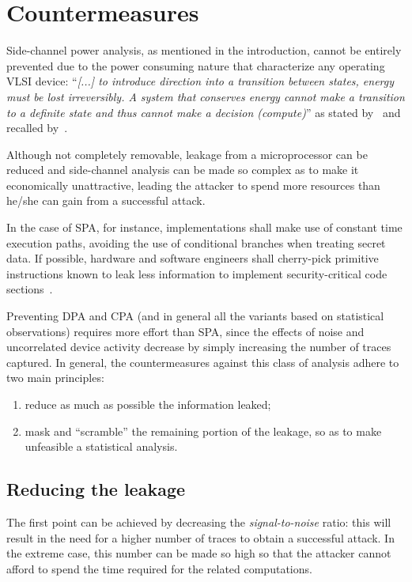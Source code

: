     \section{Countermeasures}\label{sec:countermeasures}
        Side-channel power analysis, as mentioned in the introduction, cannot be entirely prevented due to the power consuming nature that characterize any operating VLSI device: ``\textit{[...] to introduce direction into a transition between states, energy must be lost irreversibly. A system that conserves energy cannot make a transition to a definite state and thus cannot make a decision (compute)}'' as stated by~\cite{mead1980introduction} and recalled by~\cite{coron2004statistics}.

        Although not completely removable, leakage from a microprocessor can be reduced and side-channel analysis can be made so complex as to make it economically unattractive, leading the attacker to spend more resources than he/she can gain from a successful attack.
        
        In the case of SPA, for instance, implementations shall make use of constant time execution paths, avoiding the use of conditional branches when treating secret data. If possible, hardware and software engineers shall cherry-pick primitive instructions known to leak less information to implement security-critical code sections~\cite{kocher2011introduction}.

\newpage

        Preventing DPA and CPA (and in general all the variants based on statistical observations) requires more effort than SPA, since the effects of noise and uncorrelated device activity decrease by simply increasing the number of traces captured. In general, the countermeasures against this class of analysis adhere to two main principles: 

        \begin{enumerate}
            \item reduce as much as possible the information leaked;
            \item mask and ``scramble'' the remaining portion of the leakage, so as to make unfeasible a statistical analysis.
        \end{enumerate}

        \subsection{Reducing the leakage}
            The first point can be achieved by decreasing the \emph{signal-to-noise} ratio: this will result in the need for a higher number of traces to obtain a successful attack. In the extreme case, this number can be made so high so that the attacker cannot afford to spend the time required for the related computations.
            
